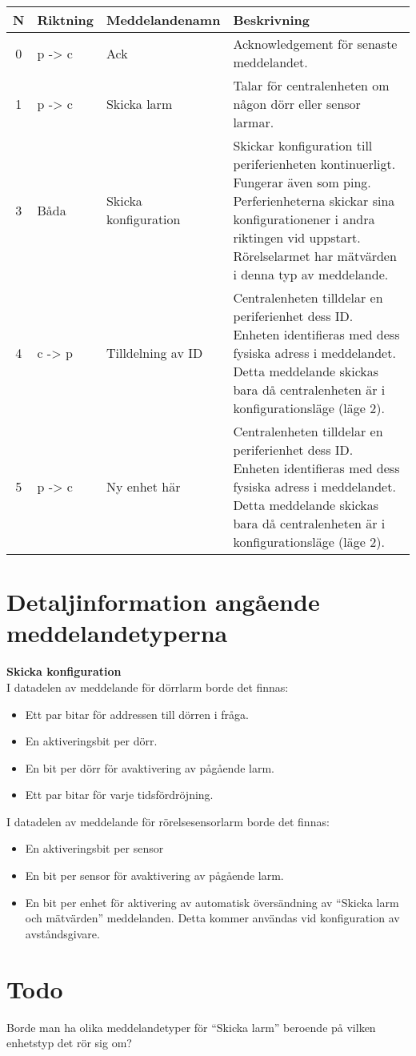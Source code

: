 \documentclass[a4paper]{article}
\begin{document}
\begin{table}[H]
	\begin{tabular}{|c|l|p{2.6cm}|p{6cm}|}
		\hline
		N& Riktning & Meddelandenamn & Beskrivning \\ \hline \hline
		0 & p -> c & Ack & Acknowledgement för senaste meddelandet. \\ \hline
		1 & p -> c & Skicka larm & Talar för centralenheten om någon dörr eller sensor larmar. \\ \hline
		3 & Båda & Skicka konfiguration & Skickar konfiguration till periferienheten kontinuerligt. Fungerar även som ping. Perferienheterna skickar sina konfigurationener i andra riktingen vid uppstart. Rörelselarmet har mätvärden i denna typ av meddelande. \\ \hline
		4 & c -> p & Tilldelning av ID & Centralenheten tilldelar en periferienhet dess ID. Enheten identifieras med dess fysiska adress i meddelandet. Detta meddelande skickas bara då centralenheten är i konfigurationsläge (läge  2). \\ \hline
		5 & p -> c & Ny enhet här & Centralenheten tilldelar en periferienhet dess ID. Enheten identifieras med dess fysiska adress i meddelandet. Detta meddelande skickas bara då centralenheten är i konfigurationsläge (läge  2). \\ \hline
	\end{tabular}
	\label{tab:meddelandetyper}
\end{table}

\section*{Detaljinformation angående meddelandetyperna}
\label{sec:detaljinfo}
\textbf{Skicka konfiguration} \\
I datadelen av meddelande för dörrlarm borde det finnas:
\begin{itemize}
	\item Ett par bitar för addressen till dörren i fråga.
	\item En aktiveringsbit per dörr.
	\item En bit per dörr för avaktivering av pågående larm.
	\item Ett par bitar för varje tidsfördröjning.
\end{itemize}

I datadelen av meddelande för rörelsesensorlarm borde det finnas:
\begin{itemize}
	\item En aktiveringsbit per sensor
	\item En bit per sensor för avaktivering av pågående larm.
	\item En bit per enhet för aktivering av automatisk översändning av “Skicka larm och mätvärden” meddelanden. Detta kommer användas vid konfiguration av avståndsgivare.
\end{itemize}

\section*{Todo}
\label{sec:todo}
Borde man ha olika meddelandetyper för “Skicka larm” beroende på vilken enhetstyp det rör sig om?



%
%
\end{document}
